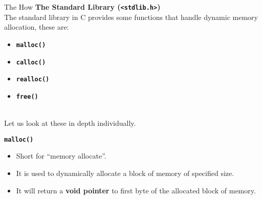 \documentclass[11pt]{beamer}
\begin{document}
    \begin{frame}[allowframebreaks]{The How}
        \textbf{The Standard Library (\texttt{<stdlib.h>})}\\[10pt]

        The standard library in C provides some functions that handle dynamic memory allocation, these are:\\[5pt]
        \begin{itemize}
            \item \textbf{\texttt{malloc()}}
            \item \textbf{\texttt{calloc()}}
            \item \textbf{\texttt{realloc()}}
            \item \textbf{\texttt{free()}}
        \end{itemize}
        \\[10pt]
        Let us look at these in depth individually.

        \framebreak

        \textbf{\texttt{\large malloc()}}\\[10pt]

        \begin{itemize}
            \item Short for ``memory allocate''.
            \item It is used to dynamically allocate a block of memory of specified size.
            \item It will return a \textbf{void pointer} to first byte of the allocated block of memory.
        \end{itemize}

    \end{frame}
\end{document}
